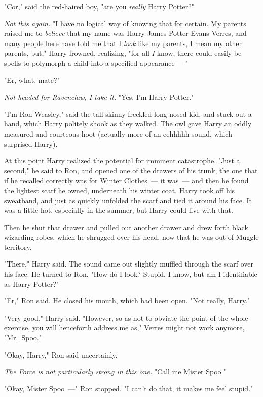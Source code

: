 "Cor," said the red-haired boy, "are you \emph{really} Harry Potter?"

\emph{Not this again.} "I have no logical way of knowing that for certain. My
parents raised me to \emph{believe} that my name was Harry James
Potter-Evans-Verres, and many people here have told me that I \emph{look} like
my parents, I mean my other parents, but," Harry frowned, realizing, "for all
\emph{I} know, there could easily be spells to polymorph a child into a
specified appearance~---"

"Er, what, mate?"

\emph{Not headed for Ravenclaw, I take it.} "Yes, I'm Harry Potter."

"I'm Ron Weasley," said the tall skinny freckled long-nosed kid, and stuck out
a hand, which Harry politely shook as they walked. The owl gave Harry an oddly
measured and courteous hoot (actually more of an eehhhhh sound, which surprised
Harry).

At this point Harry realized the potential for imminent catastrophe. "Just a
second," he said to Ron, and opened one of the drawers of his trunk, the one
that if he recalled correctly was for Winter Clothes~--- it was~--- and then he
found the lightest scarf he owned, underneath his winter coat. Harry took off
his sweatband, and just as quickly unfolded the scarf and tied it around his
face. It was a little hot, especially in the summer, but Harry could live with
that.

Then he shut that drawer and pulled out another drawer and drew forth black
wizarding robes, which he shrugged over his head, now that he was out of Muggle
territory.

"There," Harry said. The sound came out slightly muffled through the scarf over
his face. He turned to Ron. "How do I look? Stupid, I know, but am I
identifiable as Harry Potter?"

"Er," Ron said. He closed his mouth, which had been open. "Not really, Harry."

"Very good," Harry said. "However, so as not to obviate the point of the whole
exercise, you will henceforth address me as," Verres might not work anymore,
"Mr.~Spoo."

"Okay, Harry," Ron said uncertainly.

\emph{The Force is not particularly strong in this one.} "Call{\el}
me{\el} Mister{\el} Spoo."

"Okay, Mister Spoo~---" Ron stopped. "I can't do that, it makes me feel stupid."

